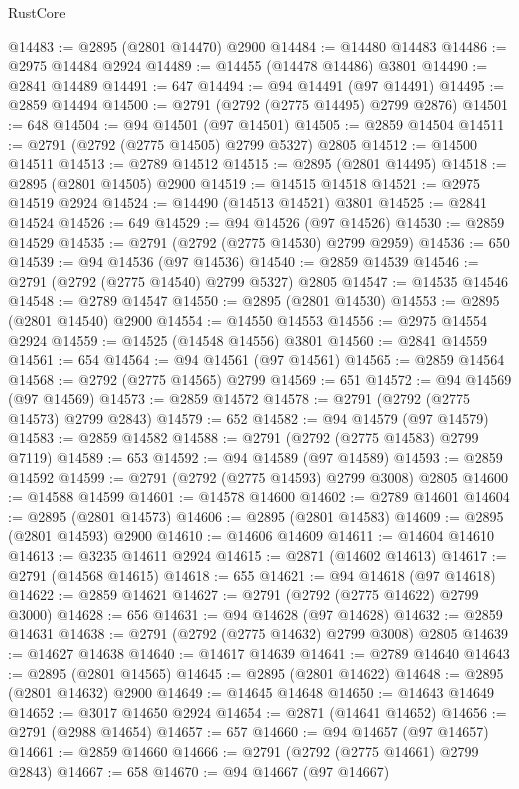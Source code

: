 \begin{lexlean}{RustCore}
\begin{coremodule}
@14483 := @2895 (@2801 @14470) @2900
@14484 := @14480 @14483
@14486 := @2975 @14484 @2924
@14489 := @14455 (@14478 @14486) @3801
@14490 := @2841 @14489
@14491 := 647
@14494 := @94 @14491 (@97 @14491)
@14495 := @2859 @14494
@14500 := @2791 (@2792 (@2775 @14495) @2799 @2876)
@14501 := 648
@14504 := @94 @14501 (@97 @14501)
@14505 := @2859 @14504
@14511 := @2791 (@2792 (@2775 @14505) @2799 @5327) @2805
@14512 := @14500 @14511
@14513 := @2789 @14512
@14515 := @2895 (@2801 @14495)
@14518 := @2895 (@2801 @14505) @2900
@14519 := @14515 @14518
@14521 := @2975 @14519 @2924
@14524 := @14490 (@14513 @14521) @3801
@14525 := @2841 @14524
@14526 := 649
@14529 := @94 @14526 (@97 @14526)
@14530 := @2859 @14529
@14535 := @2791 (@2792 (@2775 @14530) @2799 @2959)
@14536 := 650
@14539 := @94 @14536 (@97 @14536)
@14540 := @2859 @14539
@14546 := @2791 (@2792 (@2775 @14540) @2799 @5327) @2805
@14547 := @14535 @14546
@14548 := @2789 @14547
@14550 := @2895 (@2801 @14530)
@14553 := @2895 (@2801 @14540) @2900
@14554 := @14550 @14553
@14556 := @2975 @14554 @2924
@14559 := @14525 (@14548 @14556) @3801
@14560 := @2841 @14559
@14561 := 654
@14564 := @94 @14561 (@97 @14561)
@14565 := @2859 @14564
@14568 := @2792 (@2775 @14565) @2799
@14569 := 651
@14572 := @94 @14569 (@97 @14569)
@14573 := @2859 @14572
@14578 := @2791 (@2792 (@2775 @14573) @2799 @2843)
@14579 := 652
@14582 := @94 @14579 (@97 @14579)
@14583 := @2859 @14582
@14588 := @2791 (@2792 (@2775 @14583) @2799 @7119)
@14589 := 653
@14592 := @94 @14589 (@97 @14589)
@14593 := @2859 @14592
@14599 := @2791 (@2792 (@2775 @14593) @2799 @3008) @2805
@14600 := @14588 @14599
@14601 := @14578 @14600
@14602 := @2789 @14601
@14604 := @2895 (@2801 @14573)
@14606 := @2895 (@2801 @14583)
@14609 := @2895 (@2801 @14593) @2900
@14610 := @14606 @14609
@14611 := @14604 @14610
@14613 := @3235 @14611 @2924
@14615 := @2871 (@14602 @14613)
@14617 := @2791 (@14568 @14615)
@14618 := 655
@14621 := @94 @14618 (@97 @14618)
@14622 := @2859 @14621
@14627 := @2791 (@2792 (@2775 @14622) @2799 @3000)
@14628 := 656
@14631 := @94 @14628 (@97 @14628)
@14632 := @2859 @14631
@14638 := @2791 (@2792 (@2775 @14632) @2799 @3008) @2805
@14639 := @14627 @14638
@14640 := @14617 @14639
@14641 := @2789 @14640
@14643 := @2895 (@2801 @14565)
@14645 := @2895 (@2801 @14622)
@14648 := @2895 (@2801 @14632) @2900
@14649 := @14645 @14648
@14650 := @14643 @14649
@14652 := @3017 @14650 @2924
@14654 := @2871 (@14641 @14652)
@14656 := @2791 (@2988 @14654)
@14657 := 657
@14660 := @94 @14657 (@97 @14657)
@14661 := @2859 @14660
@14666 := @2791 (@2792 (@2775 @14661) @2799 @2843)
@14667 := 658
@14670 := @94 @14667 (@97 @14667)

\end{coremodule}
\end{lexlean}
